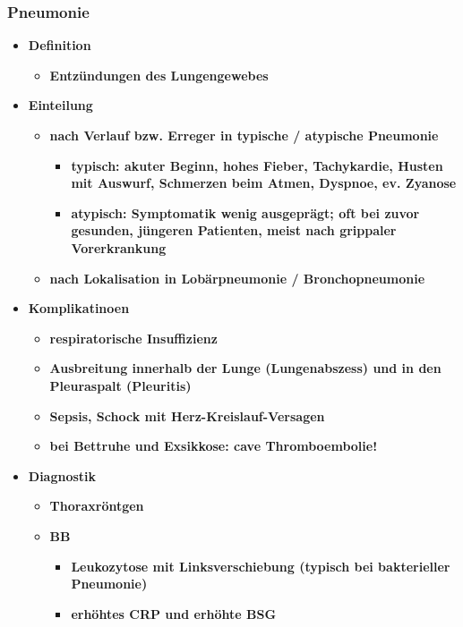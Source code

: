 		\subsubsection{Pneumonie}
			\begin{itemize}
				\item \textbf{Definition}
					\begin{itemize}
						\item \textbf{Entzündungen des Lungengewebes}
					\end{itemize}
				\item \textbf{Einteilung}
					\begin{itemize}
						\item \textbf{nach Verlauf bzw. Erreger in typische / atypische Pneumonie}
							\begin{itemize}
								\item \textbf{typisch: akuter Beginn, hohes Fieber, Tachykardie, Husten mit Auswurf, Schmerzen beim Atmen, Dyspnoe, ev. Zyanose}
								\item \textbf{atypisch: Symptomatik wenig ausgeprägt; oft bei zuvor gesunden, jüngeren Patienten, meist nach grippaler Vorerkrankung}
							\end{itemize}
						\item \textbf{nach Lokalisation in Lobärpneumonie / Bronchopneumonie}
					\end{itemize}
				\item \textbf{Komplikatinoen}
					\begin{itemize}
						\item \textbf{respiratorische Insuffizienz}
						\item \textbf{Ausbreitung innerhalb der Lunge (Lungenabszess) und in den Pleuraspalt (Pleuritis)}
						\item \textbf{Sepsis, Schock mit Herz-Kreislauf-Versagen}
						\item \textbf{bei Bettruhe und Exsikkose: cave Thromboembolie!}
					\end{itemize}
				\item \textbf{Diagnostik}
					\begin{itemize}
						\item \textbf{Thoraxröntgen}
						\item \textbf{BB}
							\begin{itemize}
								\item \textbf{Leukozytose mit Linksverschiebung (typisch bei bakterieller Pneumonie)}
								\item \textbf{erhöhtes CRP und erhöhte BSG}

\end{itemize}
\end{itemize}
\end{itemize}
